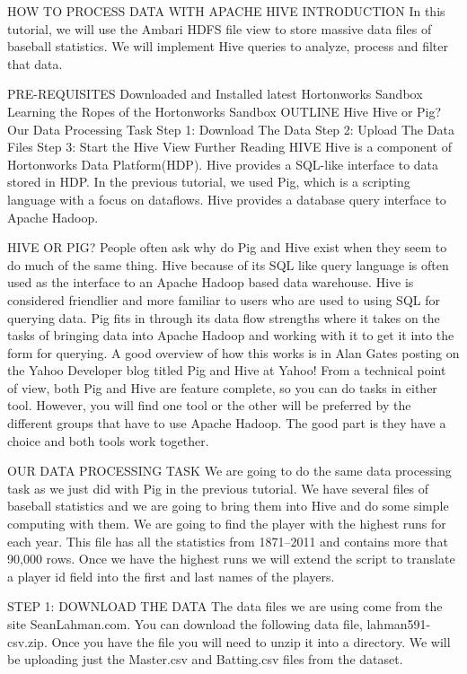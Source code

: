 HOW TO PROCESS DATA WITH APACHE HIVE
INTRODUCTION
In this tutorial, we will use the Ambari HDFS file view to store massive data files of baseball statistics. We will implement Hive queries to analyze, process and filter that data.

PRE-REQUISITES
Downloaded and Installed latest Hortonworks Sandbox
Learning the Ropes of the Hortonworks Sandbox
OUTLINE
Hive
Hive or Pig?
Our Data Processing Task
Step 1: Download The Data
Step 2: Upload The Data Files
Step 3: Start the Hive View
Further Reading
HIVE
Hive is a component of Hortonworks Data Platform(HDP). Hive provides a SQL-like interface to data stored in HDP. In the previous tutorial,
we used Pig, which is a scripting language with a focus on dataflows. Hive provides a database query interface to Apache Hadoop.

HIVE OR PIG?
People often ask why do Pig and Hive exist when they seem to do much of the same thing. Hive because of its SQL like query language is
often used as the interface to an Apache Hadoop based data warehouse. Hive is considered friendlier and more familiar to users who are
used to using SQL for querying data. Pig fits in through its data flow strengths where it takes on the tasks of bringing data into Apache
Hadoop and working with it to get it into the form for querying. A good overview of how this works is in Alan Gates posting on the Yahoo
Developer blog titled Pig and Hive at Yahoo! From a technical point
of view, both Pig and Hive are feature complete, so you can do tasks in either tool. However, you will find one tool or the other will be
preferred by the different groups that have to use Apache Hadoop. The good part is they have a choice and both tools work together.

OUR DATA PROCESSING TASK
We are going to do the same data processing task as we just did with Pig in the previous tutorial. We have several files of baseball
statistics and we are going to bring them into Hive and do some simple computing with them. We are going to find the player with the
highest runs for each year. This file has all the statistics from 1871–2011 and contains more that 90,000 rows. Once we have the highest
runs we will extend the script to translate a player id field into the first and last names of the players.

STEP 1: DOWNLOAD THE DATA
The data files we are using come from the site SeanLahman.com. You can download the following data file,
lahman591-csv.zip. Once you have the file you will need to unzip it into a
directory. We will be uploading just the Master.csv and Batting.csv files from the dataset.

